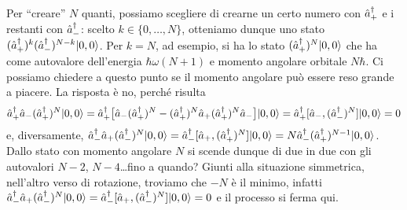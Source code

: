 Per ``creare'' $N$ quanti, possiamo scegliere di crearne un certo numero con $\hat{a}_+^\dagger$ e i restanti con $\hat{a}_-^\dagger$: scelto $k\in\{0,\dots,N\}$, otteniamo dunque uno stato $(\hat{a}_+^\dagger)^k(\hat{a}_-^\dagger)^{N-k}\lvert0,0\rangle$.
Per $k=N$, ad esempio, si ha lo stato $(\hat{a}_+^\dagger)^N\lvert0,0\rangle$ che ha come autovalore dell'energia $\hbar\omega(N+1)$ e momento angolare orbitale $N\hbar$.
Ci possiamo chiedere a questo punto se il momento angolare può essere reso grande a piacere.
La risposta è no, perch\'e risulta
\begin{equation}
	\hat{a}_+^\dagger\hat{a}_-(\hat{a}_+^\dagger)^N\lvert0,0\rangle=\hat{a}_+^\dagger\big[\hat{a}_-(\hat{a}_+^\dagger)^N-(\hat{a}_+^\dagger)^N\hat{a}_+(\hat{a}_+^\dagger)^N\hat{a}_-\big]\lvert0,0\rangle=\hat{a}_+^\dagger[\hat{a}_-,(\hat{a}_-^\dagger)^N]\lvert0,0\rangle=0
\end{equation}
e, diversamente, $\hat{a}_-^\dagger\hat{a}_+(\hat{a}_-^\dagger)^N\lvert0,0\rangle=\hat{a}_-^\dagger[\hat{a}_+,(\hat{a}_+^\dagger)^N]\lvert0,0\rangle=N\hat{a}_-^\dagger(\hat{a}_+^\dagger)^{N-1}\lvert0,0\rangle$.
Dallo stato con momento angolare $N$ si scende dunque di due in due con gli autovalori $N-2$, $N-4$\dots fino a quando?
Giunti alla situazione simmetrica, nell'altro verso di rotazione, troviamo che $-N$ è il minimo, infatti $\hat{a}_-^\dagger\hat{a}_+(\hat{a}_-^\dagger)^N\lvert0,0\rangle=\hat{a}_-^\dagger[\hat{a}_+,(\hat{a}_-^\dagger)^N]\lvert0,0\rangle=0$ e il processo si ferma qui.

